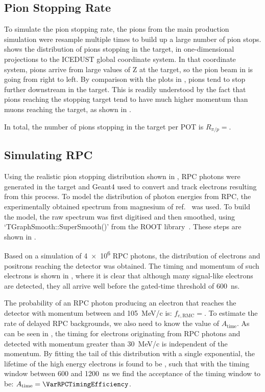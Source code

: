 \subsection{Pion Stopping Rate}
\FigPionStopDist
\FigPiVsMuMomenta
To simulate the pion stopping rate, the pions from the main production simulation were resample multiple times to build up a large number of pion stops.
 shows the distribution of pions stopping in the target, in one-dimensional projections to the ICEDUST global coordinate system.
In that coordinate system, pions arrive from large values of Z at the target, so the pion beam in  is going from right to left.
By comparison with the plots in , pions tend to stop further downstream in the target.
This is readily understood by the fact that pions reaching the stopping target tend to have much higher momentum than muons reaching the target, as shown in .

In total, the number of pions stopping in the target per \ac{POT} is $R_{\pi/p}=$\VarPiStopsPerPOT.

\subsection{Simulating \acs{RPC}}
\FigRPCSimulatedSpectrum
\FigRPCSimResults
Using the realistic pion stopping distribution shown in , \ac{RPC} photons were generated in the target and Geant4 used to convert and track electrons resulting from this process.
To model the distribution of photon energies from \ac{RPC}, the experimentally obtained spectrum from magnesium of ref.~\cite{Bistirlich:1972jy} was used.
To build the model, the raw spectrum was first digitised and then smoothed, using `TGraphSmooth::SuperSmooth()' from the  ROOT library~\cite{ROOT}.
These steps are shown in .

Based on a simulation of \num{4e6} RPC photons, the distribution of electrons and positrons reaching the detector was obtained.
The timing and momentum of such electrons is shown in , where it is clear that although many signal-like electrons are detected, they all arrive well before the gated-time threshold of 600~ns.

The probability of an \ac{RPC} photon producing an electron that reaches the detector with momentum between \VarMomThreshold and 105~MeV/c is: $f_{e,\textrm{RMC}}=$\VarDetectedEsPerRPC.
To estimate the rate of delayed \ac{RPC} backgrounds, we also need to know the value of $A_\textrm{time}$.
As can be seen in , the timing for electrons originating from RPC photons and detected with momentum greater than 30~MeV/c is independent of the momentum.
By fitting the tail of this distribution with a single exponential, the lifetime of the high energy electrons is found to be \VarRPCLifetime, such that with the timing window between 600 and 1200~ns we find the acceptance of the timing window to be: $A_\textrm{time}=\VarRPCTimingEfficiency$.


